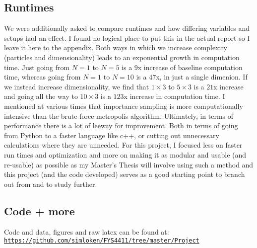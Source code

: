 \documentclass{article}
\begin{document}
\subsection{Runtimes}
We were additionally asked to compare runtimes and how differing variables and setups had an effect. I found no logical place to put this in the actual report so I leave it here to the appendix. \newline
Both ways in which we increase complexity (particles and dimensionality) leads to an exponential growth in computation time. Just going from $N=1$ to $N=5$ is a $9$x increase of baseline computation time, whereas going from $N=1$ to $N=10$ is a $47$x, in just a single dimenion. If we instead increase dimensionality, we find that $1\times3$ to $5\times 3$ is a $21$x increase and going all the way to $10\times 3$ is a $123$x increase in computation time. \newline 
I mentioned at various times that importance sampling is more computationally intensive than the brute force metropolis algorithm. \newline
Ultimately, in terms of performance there is a lot of leeway for improvement. Both in terms of going from Python to a faster language like c++, or cutting out unnecessary calculations where they are unneeded. \newpage For this project, I focused less on faster run times and optimization and more on making it as modular and usable (and re-usable) as possible as my Master's Thesis will involve using such a method and this project (and the code developed) serves as a good starting point to branch out from and to study further.
\subsection{Code + more}
Code and data, figures and raw latex can be found at: \newline \href{https://github.com/simloken/FYS4411/tree/master/Project_1}{\texttt{https://github.com/simloken/FYS4411/tree/master/Project}}
\end{document}
